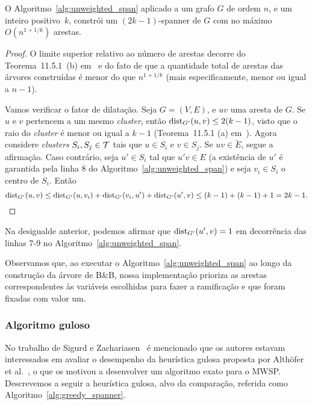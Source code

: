 \begin{teorema}
  O Algoritmo~\ref{alg:unweighted_span} aplicado a um grafo $G$ de
  ordem $n$, e um inteiro positivo~$k$,  constrói um $(2k-1)$-spanner de
  $G$ com no máximo $O(n^{1+1/k})$ arestas.
  \begin{proof}
    O limite superior relativo ao número de arestas decorre do Teorema~11.5.1~(b)
    em~\cite{Peleg2000} e do fato de que a quantidade total de arestas
    das árvores construídas é menor do que $n^{1 + 1/k}$ (mais especificamente,
    menor ou igual a $n-1$).

    Vamos verificar o fator de dilatação. Seja $G=(V,E)$, e 
    $uv$ uma aresta de $G$. Se $u$ e $v$ pertencem a um mesmo \emph{cluster}, então
    ${\mathrm{dist}}_{G'}(u,v) \le 2(k-1)$, visto que o raio do \emph{cluster}
    é menor ou igual a $k-1$ (Teorema~11.5.1 (a)
    em~\cite{Peleg2000}). Agora considere \emph{clusters} $S_i, S_j \in \mathcal{T}$
    tais que $u \in S_i$ e $v \in S_j$.  Se $uv \in \breve{E}$, segue a
    afirmação. Caso contrário, seja $u' \in S_i$ tal que
    $u'v \in E$ (a existência de $u'$ é garantida pela linha 8 do
    Algoritmo~\ref{alg:unweighted_span}) e seja $v_i \in S_i$ o centro de $S_i$. Então
%
$${\mathrm{dist}}_{G'}(u,v)\le {\mathrm{dist}}_{G'}(u,v_i) + {\mathrm{dist}}_{G'}(v_i,u') + {\mathrm{dist}}_{G'}(u',v) \le (k-1) + (k-1) + 1 = 2k -1.$$
    \end{proof}
\end{teorema}
Na desigualde anterior, podemos afirmar que ${\mathrm{dist}}_{G'}(u',v) = 1$ em
decorrência das linhas 7-9 no Algoritmo~\ref{alg:unweighted_span}.

Observamos que, ao executar o Algoritmo~\ref{alg:unweighted_span} ao
longo da construção da árvore de B\&B, nossa implementação prioriza as arestas
correspondentes às variáveis escolhidas para fazer a ramificação e que
foram fixadas com valor um.

\subsubsection{Algoritmo guloso}
No trabalho de Sigurd e Zachariasen~\cite{SigurdZ2004} é mencionado
que os autores estavam interessados em avaliar o desempenho da
heurística gulosa proposta por Alth\"{o}fer et
al.~\cite{AlthoferDDJS1993}, o que os motivou a desenvolver um
algoritmo exato para o MWSP.  Descrevemos a seguir a heurística
gulosa, alvo da comparação, referida como
Algoritmo~\ref{alg:greedy_spanner}.

